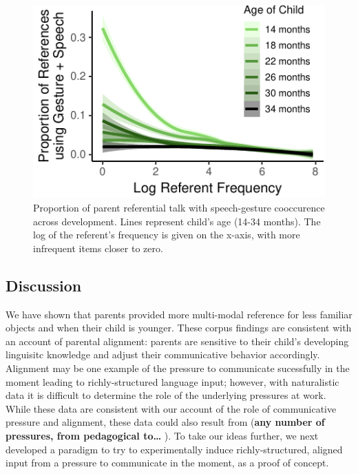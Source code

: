 \documentclass[10pt, letterpaper]{article}
\newenvironment{CodeChunk}{}{}
\begin{document}
\begin{CodeChunk}
\begin{figure}[tb]

{\centering \includegraphics{figs/corpus_plot-1} 

}

\caption[Proportion of parent referential talk with speech-gesture cooccurence across development]{Proportion of parent referential talk with speech-gesture cooccurence across development. Lines represent child's age (14-34 months). The log of the referent's frequency is given on the x-axis, with more infrequent items closer to zero.}\label{fig:corpus_plot}
\end{figure}
\end{CodeChunk}

\hypertarget{discussion}{%
\subsection{Discussion}\label{discussion}}

We have shown that parents provided more multi-modal reference for less
familiar objects and when their child is younger. These corpus findings
are consistent with an account of parental alignment: parents are
sensitive to their child's developing linguisitc knowledge and adjust
their communicative behavior accordingly. Alignment may be one example
of the pressure to communicate sucessfully in the moment leading to
richly-structured language input; however, with naturalistic data it is
difficult to determine the role of the underlying pressures at work.
While these data are consistent with our account of the role of
communicative pressure and alignment, these data could also result from
(\textbf{any number of pressures, from pedagogical to\ldots{} }). To
take our ideas further, we next developed a paradigm to try to
experimentally induce richly-structured, aligned input from a pressure
to communicate in the moment, as a proof of concept.
\end{document}
